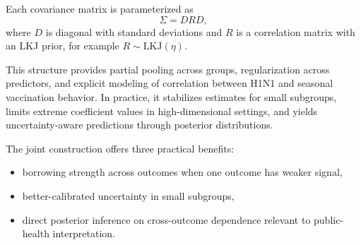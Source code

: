 Each covariance matrix is parameterized as
\[
\Sigma = D R D,
\]
where $D$ is diagonal with standard deviations and $R$ is a correlation matrix with an LKJ prior, for example $R \sim \mathrm{LKJ}(\eta)$.

This structure provides partial pooling across groups, regularization across predictors, and explicit modeling of correlation between H1N1 and seasonal vaccination behavior. In practice, it stabilizes estimates for small subgroups, limits extreme coefficient values in high-dimensional settings, and yields uncertainty-aware predictions through posterior distributions.

The joint construction offers three practical benefits:
\begin{itemize}
\item borrowing strength across outcomes when one outcome has weaker signal,
\item better-calibrated uncertainty in small subgroups,
\item direct posterior inference on cross-outcome dependence relevant to public-health interpretation.
\end{itemize}